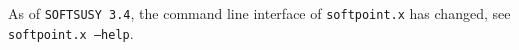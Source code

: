 \documentclass[final,3p,times,pdflatex]{elsarticle}
\def\code#1{\small{\tt #1}\normalsize}
\newcommand{\MSbar}{{\overline{MS}}}
\begin{document}
As of {\tt SOFTSUSY 3.4}, the command line interface of \code{softpoint.x} has
changed, see \code{softpoint.x --help}.  
%
%
%
\end{document}
